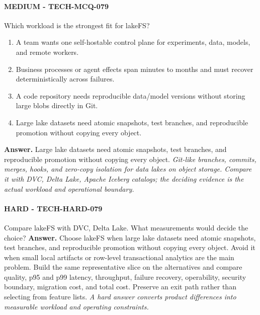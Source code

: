 \paragraph{MEDIUM - TECH-MCQ-079} Which workload is the strongest fit for lakeFS?
\begin{enumerate}[label=\Alph*.]
\item A team wants one self-hostable control plane for experiments, data, models, and remote workers.
\item Business processes or agent effects span minutes to months and must recover deterministically across failures.
\item A code repository needs reproducible data/model versions without storing large blobs directly in Git.
\item Large lake datasets need atomic snapshots, test branches, and reproducible promotion without copying every object.
\end{enumerate}
\textbf{Answer.} Large lake datasets need atomic snapshots, test branches, and reproducible promotion without copying every object.
\textit{Git-like branches, commits, merges, hooks, and zero-copy isolation for data lakes on object storage. Compare it with DVC, Delta Lake, Apache Iceberg catalogs; the deciding evidence is the actual workload and operational boundary.}
\paragraph{HARD - TECH-HARD-079} Compare lakeFS with DVC, Delta Lake. What measurements would decide the choice?
\textbf{Answer.} Choose lakeFS when large lake datasets need atomic snapshots, test branches, and reproducible promotion without copying every object. Avoid it when small local artifacts or row-level transactional analytics are the main problem. Build the same representative slice on the alternatives and compare quality, p95 and p99 latency, throughput, failure recovery, operability, security boundary, migration cost, and total cost. Preserve an exit path rather than selecting from feature lists.
\textit{A hard answer converts product differences into measurable workload and operating constraints.}
